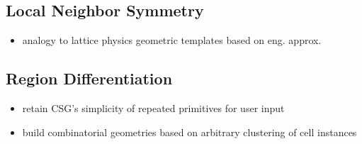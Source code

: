 \subsection{Local Neighbor Symmetry}
\label{sec:chap3-lns}

\begin{itemize}[noitemsep]
  \item analogy to lattice physics geometric templates based on eng. approx.
\end{itemize}

\subsection{Region Differentiation}
\label{sec:chap3-region-diff}

\begin{itemize}[noitemsep]
  \item retain CSG's simplicity of repeated primitives for user input
  \item build combinatorial geometries based on arbitrary clustering of cell instances
\end{itemize}